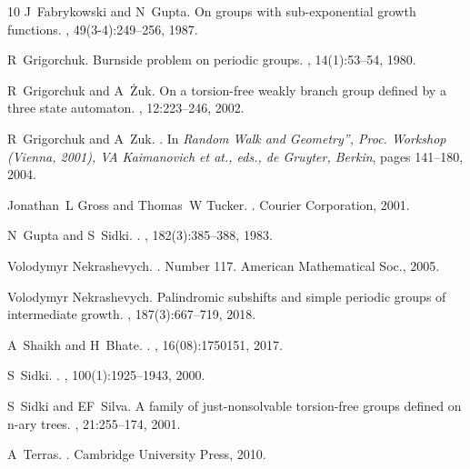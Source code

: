 \documentclass{article}
\begin{document}
\begin{thebibliography}{10}
J~Fabrykowski and N~Gupta.
\newblock On groups with sub-exponential growth functions.
, 49(3-4):249--256, 1987.

R~Grigorchuk.
\newblock Burnside problem on periodic groups.
, 14(1):53--54, 1980.

R~Grigorchuk and A~{\.Z}uk.
\newblock On a torsion-free weakly branch group defined by a three state automaton.
, 12:223--246, 2002.

R~Grigorchuk and A~Zuk.
.
\newblock In {\em Random Walk and Geometry”, Proc. Workshop (Vienna, 2001), VA Kaimanovich et at., eds., de Gruyter, Berkin}, pages 141--180, 2004.

Jonathan~L Gross and Thomas~W Tucker.
.
\newblock Courier Corporation, 2001.

N~Gupta and S~Sidki.
.
, 182(3):385--388, 1983.

Volodymyr Nekrashevych.
.
\newblock Number 117. American Mathematical Soc., 2005.

Volodymyr Nekrashevych.
\newblock Palindromic subshifts and simple periodic groups of intermediate growth.
, 187(3):667--719, 2018.

A~Shaikh and H~Bhate.
.
, 16(08):1750151, 2017.

S~Sidki.
.
, 100(1):1925--1943, 2000.

S~Sidki and EF~Silva.
\newblock A family of just-nonsolvable torsion-free groups defined on n-ary trees.
, 21:255--174, 2001.

A~Terras.
.
\newblock Cambridge University Press, 2010.

\end{thebibliography}
\end{document}
